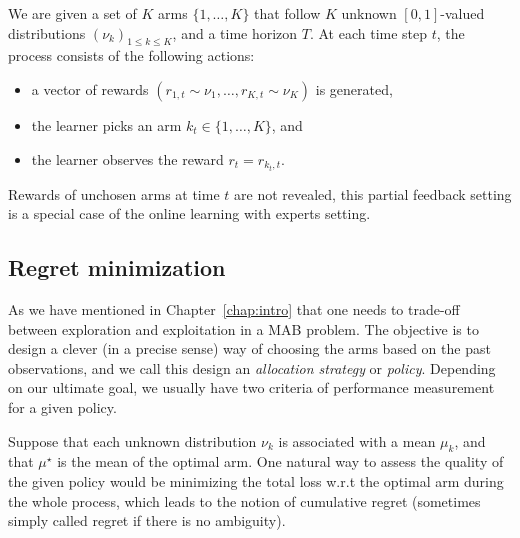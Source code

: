 \begin{definition}\label{def:mab.mab}
\begin{leftbar}[defnbar]
	We are given a set of $K$ arms $\{1,\ldots,K\}$ that follow $K$ unknown $[0,1]$-valued distributions $(\nu_k)_{1 \leq k \leq K}$, and a time horizon $T$. At each time step $t$, the process consists of the following actions:
	\begin{itemize}
		\item a vector of rewards $(r_{1,t} \sim \nu_1, \ldots, r_{K,t} \sim \nu_K)$ is generated,
		\item the learner picks an arm $k_t \in \{1,\ldots,K\}$, and
		\item the learner observes the reward $r_t = r_{k_t, t}$.
	\end{itemize}
\end{leftbar}
\end{definition}

\begin{remark}\label{remark:mab.partial}
\begin{leftbar}[remarkbar]
	Rewards of unchosen arms at time $t$ are not revealed, this partial feedback setting is a special case of the online learning with experts setting.
\end{leftbar}
\end{remark}

\subsection{Regret minimization}\label{sec:mab.model.regret}

As we have mentioned in Chapter~\ref{chap:intro} that one needs to trade-off between exploration and exploitation in a MAB problem. The objective is to design a clever (in a precise sense) way of choosing the arms based on the past observations, and we call this design an \emph{allocation strategy} or \emph{policy}. Depending on our ultimate goal, we usually have two criteria of performance measurement for a given policy.

Suppose that each unknown distribution $\nu_k$ is associated with a mean $\mu_k$, and that $\mu^{\star}$ is the mean of the optimal arm. One natural way to assess the quality of the given policy would be minimizing the total loss w.r.t the optimal arm during the whole process, which leads to the notion of \gls{cumulative regret} (sometimes simply called regret if there is no ambiguity).

